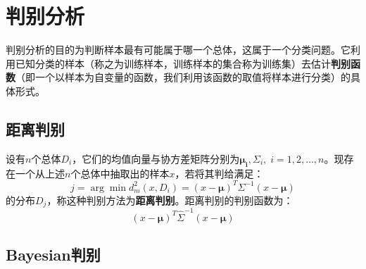 \section{判别分析}

判别分析的目的为判断样本最有可能属于哪一个总体，这属于一个分类问题。它利用已知分类的样本（称之为训练样本，训练样本的集合称为训练集）去估计\textbf{判别函数}（即一个以样本为自变量的函数，我们利用该函数的取值将样本进行分类）的具体形式。

\subsection{距离判别}
\begin{definition}
	设有$n$个总体$D_i$，它们的均值向量与协方差矩阵分别为$\boldsymbol{\mu_i},\Sigma_i,\;i=1,2,\dots,n$。现存在一个从上述$n$个总体中抽取出的样本$x$，若将其判给满足：
	\begin{equation*}
		j=\arg\min d^2_m(x,D_i)=(x-\boldsymbol{\mu})^T\Sigma^{-1}(x-\boldsymbol{\mu})
	\end{equation*}
	的分布$D_j$，称这种判别方法为\textbf{距离判别}。距离判别的判别函数为：
	\begin{equation*}
		(x-\boldsymbol{\mu})^T\hat{\Sigma}^{-1}(x-\boldsymbol{\mu})
	\end{equation*}
\end{definition}

\subsection{Bayesian判别}

